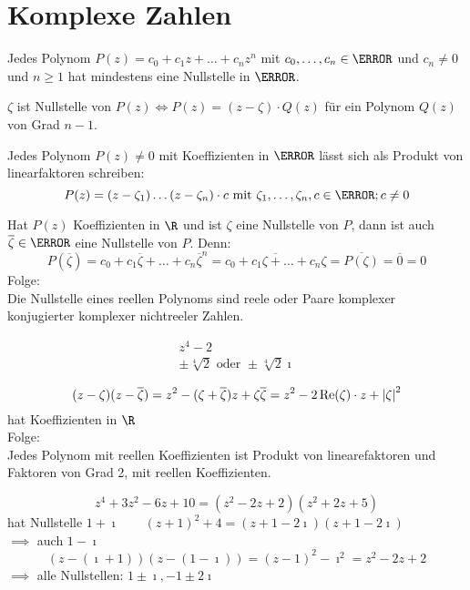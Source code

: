 \chapter{Komplexe Zahlen}
\begin{satz*}[note = Fundamentalsatz der Algebra , index = Fundamentalsatz der Algebra]
	Jedes Polynom $P(z) = c_0 + c_1 z + \dots + c_n z^n$ mit $c_0 , \dotsc , c_n \in \C$ und $c_n \neq 0$ und $n \geq 1$ hat mindestens eine Nullstelle in $\C$.
\end{satz*}
\begin{fakt}
	$\zeta$ ist Nullstelle von $P(z) \iff P(z) = (z - \zeta) \cdot Q(z)$ für ein Polynom $Q(z)$ von Grad $n-1$.
\end{fakt}
\begin{satz*}[note = Fundamentalsatz der Algebra 2 , index = Fundamentalsatz der Algebra]
	Jedes Polynom $P(z) \neq 0$ mit Koeffizienten in $\C$ lässt sich als Produkt von linearfaktoren schreiben:
	\[ P(z) = (z - \zeta_1) \dots (z - \zeta_n) \cdot c \text{ mit } \zeta_1 , \dotsc , \zeta_n , c \in \C ; c \neq 0 \]
\end{satz*}
\begin{bem}
	Hat $P(z)$ Koeffizienten in $\R$ und ist $\zeta$ eine Nullstelle von $P$, dann ist auch $\overline{\zeta} \in \C$ eine Nullstelle von $P$. Denn:
	\[ P(\overline{\zeta}) = c_0 + c_1 \overline{\zeta} + \dots + c_n \overline{\zeta}^n = \overline{c_0 + c_1 \zeta + \dots + c_n \zeta} = \overline{P(\zeta)} = \overline{0} = 0 \]
	Folge: \\
	Die Nullstelle eines reellen Polynoms sind reele oder Paare komplexer konjugierter komplexer nichtreeler Zahlen.
\end{bem}
\begin{bsp*}
	\begin{gather*}
		z^4 - 2 \\
		\pm \sqrt[4]{2} \text{ oder } \pm \sqrt[4]{2} \imath
	\end{gather*}
\end{bsp*}

\[ (z - \zeta)(z - \overline{\zeta}) = z^2 - (\zeta + \overline{\zeta}) z + \zeta \overline{\zeta} = z^2 - 2 \Re(\zeta) \cdot z + \abs{\zeta}^2 \]
hat Koeffizienten in $\R$ \\
Folge: \\
Jedes Polynom mit reellen Koeffizienten ist Produkt von linearefaktoren und Faktoren von Grad 2, mit reellen Koeffizienten. \\
\begin{bsp*}
	\[ z^4 + 3z^2 - 6z + 10 = (z^2 - 2z + 2)(z^2 + 2z + 5) \]
	hat Nullstelle $1 + \imath \qquad (z + 1)^2 + 4 = (z + 1 - 2\imath)(z + 1 - 2\imath)$ \\
	$\implies$ auch $1 - \imath$
	\[ (z - (\imath + 1))(z - (1 - \imath)) = (z-1)^2 - \imath^2 = z^2 - 2z + 2 \]
	$\implies$ alle Nullstellen: $1 \pm \imath , -1 \pm 2\imath$
\end{bsp*}

